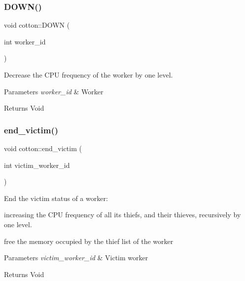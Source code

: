 \subsubsection{\texorpdfstring{D\+O\+W\+N()}{DOWN()}}
{\footnotesize\ttfamily void cotton\+::\+D\+O\+WN (\begin{DoxyParamCaption}\item[{int}]{worker\+\_\+id }\end{DoxyParamCaption})}

Decrease the C\+PU frequency of the worker by one level.


\begin{DoxyParams}{Parameters}
{\em worker\+\_\+id} & Worker\\
\hline
\end{DoxyParams}
\begin{DoxyReturn}{Returns}
Void 
\end{DoxyReturn}
\mbox{\label{cotton-runtime_8h_file_a824fc414cfcf95d0d928f9736490ab41}} 
\subsubsection{\texorpdfstring{end\+\_\+victim()}{end\_victim()}}
{\footnotesize\ttfamily void cotton\+::end\+\_\+victim (\begin{DoxyParamCaption}\item[{int}]{victim\+\_\+worker\+\_\+id }\end{DoxyParamCaption})}

End the victim status of a worker\+:
\begin{DoxyItemize}
\item increasing the C\+PU frequency of all its thiefs, and their thieves, recursively by one level.
\item free the memory occupied by the thief list of the worker
\end{DoxyItemize}


\begin{DoxyParams}{Parameters}
{\em victim\+\_\+worker\+\_\+id} & Victim worker\\
\hline
\end{DoxyParams}
\begin{DoxyReturn}{Returns}
Void 
\end{DoxyReturn}
\mbox{\label{cotton-runtime_8h_file_a2faa5f098d14f1a3319101ff735bf016}} 
